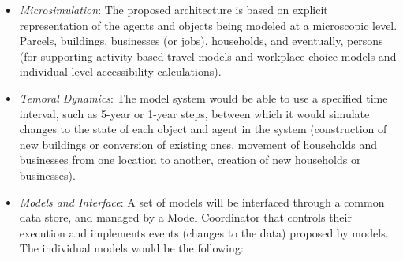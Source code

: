 \begin{itemize}
\item \emph{Microsimulation}: The proposed architecture is based on explicit representation of the agents and objects being modeled at a microscopic level.  Parcels, buildings, businesses (or jobs), households, and eventually, persons (for supporting activity-based travel models and workplace choice models and individual-level accessibility calculations).

\item \emph{Temoral Dynamics}: The model system would be able to use a specified time interval, such as 5-year or 1-year steps, between which it would simulate changes to the state of each object and agent in the system (construction of new buildings or conversion of existing ones, movement of households and businesses from one location to another, creation of new households or businesses).

\item \emph{Models and Interface}: A set of models will be interfaced through a common data store, and managed by a Model Coordinator that controls their execution and implements events (changes to the data) proposed by models.  The individual models would be the following:


\end{itemize}
